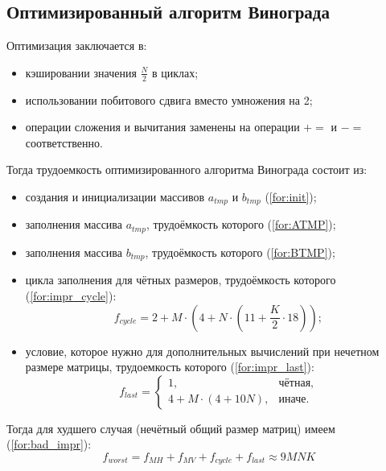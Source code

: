 \subsection{Оптимизированный алгоритм Винограда}

Оптимизация заключается в:
\begin{itemize}
	\item кэшировании значения $\frac{N}{2}$ в циклах;
    \item использовании побитового сдвига вместо умножения на 2;
    \item операции сложения и вычитания заменены на операции $+=$ и $-=$ соответственно. \newline
\end{itemize}

Тогда трудоемкость оптимизированного алгоритма Винограда состоит из:

\begin{itemize}
	\item создания и инициализации массивов $a_{tmp}$ и $b_{tmp}$ (\ref{for:init});

	\item заполнения массива $a_{tmp}$, трудоёмкость которого (\ref{for:ATMP});

	\item заполнения массива  $b_{tmp}$, трудоёмкость которого (\ref{for:BTMP});

	\item цикла заполнения для чётных размеров, трудоёмкость которого (\ref{for:impr_cycle}):
	\begin{equation}
		\label{for:impr_cycle}
		f_{cycle} =2 + M \cdot (4 + N \cdot (11 + \frac{K}{2} \cdot 18));
	\end{equation}

	\item условие, которое нужно для дополнительных вычислений при нечетном размере матрицы, трудоемкость которого (\ref{for:impr_last}):
	\begin{equation}
		\label{for:impr_last}
		f_{last} =
		\begin{cases}
			1, & \text{чётная,}\\
			4 + M \cdot (4 + 10N), & \text{иначе.}
		\end{cases}
	\end{equation}
\end{itemize}

Тогда для худшего случая (нечётный общий размер матриц) имеем (\ref{for:bad_impr}):
\begin{equation}
	\label{for:bad_impr}
	f_{worst} = f_{MH} + f_{MV} + f_{cycle} + f_{last} \approx 9MNK
\end{equation}

